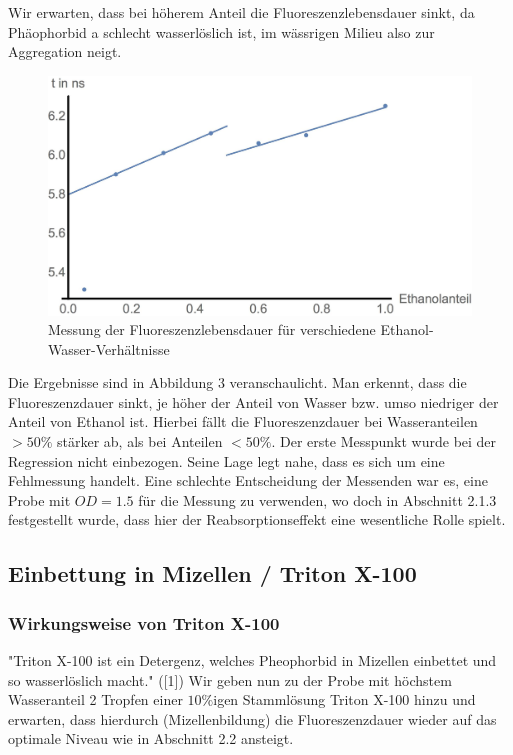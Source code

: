 \documentclass{article}
\begin{document}
Wir erwarten, dass bei höherem Anteil die Fluoreszenzlebensdauer sinkt, da Phäophorbid a schlecht wasserlöslich ist, im wässrigen Milieu also zur
Aggregation neigt.

\begin{figure}[h]
  \centering
  \includegraphics[width=\textwidth]{Bilder/FitEthH2O.jpg}
  \caption{Messung der Fluoreszenzlebensdauer für verschiedene Ethanol-Wasser-Verhältnisse}
\end{figure}

Die Ergebnisse sind in Abbildung 3 veranschaulicht. Man erkennt, dass die Fluoreszenzdauer sinkt, je höher der Anteil von Wasser bzw.
umso niedriger der Anteil von Ethanol ist. Hierbei fällt die Fluoreszenzdauer bei Wasseranteilen $>50\%$ stärker ab, als bei Anteilen $<50\%$.
Der erste Messpunkt wurde bei der Regression nicht einbezogen. Seine Lage legt nahe, dass es sich um eine Fehlmessung handelt. Eine schlechte Entscheidung
der Messenden war es, eine Probe mit $OD = 1.5$ für die Messung zu verwenden, wo doch in Abschnitt 2.1.3 festgestellt wurde, dass hier der
Reabsorptionseffekt eine wesentliche Rolle spielt.






\subsection{Einbettung in Mizellen / Triton X-100}


\subsubsection{Wirkungsweise von Triton X-100}
"Triton X-100 ist ein Detergenz, welches Pheophorbid in Mizellen einbettet und so wasserlöslich
macht." ([1]) Wir geben nun zu der Probe mit höchstem Wasseranteil 2 Tropfen einer $10\%$igen Stammlösung Triton X-100
hinzu und erwarten, dass hierdurch (Mizellenbildung) die Fluoreszenzdauer wieder auf das optimale Niveau wie in Abschnitt 2.2 ansteigt.
\end{document}
